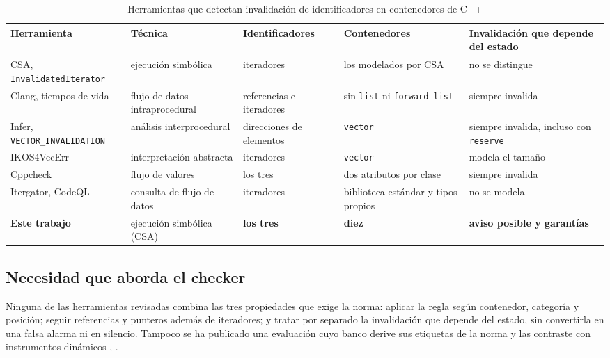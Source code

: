 \documentclass[conference]{IEEEtran}
\newcommand{\code}[1]{\texttt{#1}}
\begin{document}
\begin{table}[!b]
\caption{Herramientas que detectan invalidación de identificadores en contenedores de C++}
\label{tab:comparacion}
\centering
\footnotesize
\setlength{\tabcolsep}{4pt}\begin{tabular}{@{}>{\raggedright\arraybackslash}p{3.5cm} >{\raggedright\arraybackslash}p{2.8cm} >{\raggedright\arraybackslash}p{2.6cm} >{\raggedright\arraybackslash}p{3.0cm} >{\raggedright\arraybackslash}p{4.4cm}@{}}
\hline
\textbf{Herramienta} & \textbf{Técnica} & \textbf{Identificadores} & \textbf{Contenedores} & \textbf{Invalidación que depende del estado}\\
\hline
CSA, \code{InvalidatedIterator} \cite{csadoc} & ejecución simbólica & iteradores & los modelados por CSA & no se distingue\\
Clang, tiempos de vida \cite{saxena26} & flujo de datos intraprocedural & referencias e iteradores & sin \code{list} ni \code{forward\_list} & siempre invalida\\
Infer, \code{VECTOR\_INVALIDATION} \cite{infer} & análisis interprocedural & direcciones de elementos & \code{vector} & siempre invalida, incluso con \code{reserve}\\
IKOS4VecErr \cite{liu25} & interpretación abstracta & iteradores & \code{vector} & modela el tamaño\\
Cppcheck \cite{cppcheck} & flujo de valores & los tres & dos atributos por clase & siempre invalida\\
Itergator, CodeQL \cite{higgs20} & consulta de flujo de datos & iteradores & biblioteca estándar y tipos propios & no se modela\\
\textbf{Este trabajo} & ejecución simbólica (CSA) & \textbf{los tres} & \textbf{diez} & \textbf{aviso posible y garantías}\\
\hline
\end{tabular}
\end{table}

\subsection{Necesidad que aborda el checker}

Ninguna de las herramientas revisadas combina las tres propiedades que exige la norma: aplicar la regla según contenedor, categoría y posición; seguir referencias y punteros además de iteradores; y tratar por separado la invalidación que depende del estado, sin convertirla en una falsa alarma ni en silencio. Tampoco se ha publicado una evaluación cuyo banco derive sus etiquetas de la norma y las contraste con instrumentos dinámicos \cite{kashyap19}, \cite{klinger19}.
\end{document}
